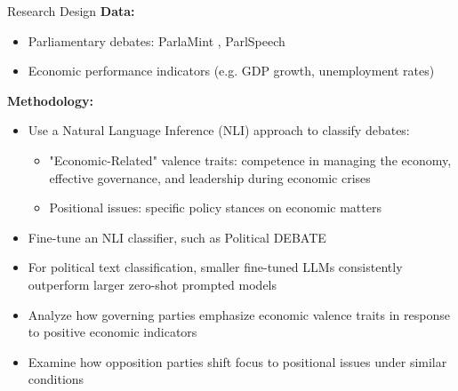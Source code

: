 \documentclass[9pt, aspectratio=169]{beamer}
\newcommand{\customcite}[1]{\textcolor{blue}{\footnotesize\parencite{#1}}}
\begin{document}
\begin{frame}{Research Design}
    \textbf{Data:} \vspace{0.1cm}
    \begin{itemize}
        \item Parliamentary debates: ParlaMint \customcite{erjavec2023parlamint}, ParlSpeech \customcite{rauh2020parlspeech} \vspace{0.1cm}
        \item Economic performance indicators (e.g. GDP growth, unemployment rates)
    \end{itemize}
    \vspace{0.3cm}
    
    \textbf{Methodology:} \vspace{0.1cm}
    \begin{itemize}
        \item Use a Natural Language Inference (NLI) approach to classify debates:\vspace{0.1cm}
        \begin{itemize}
            \item "Economic-Related" valence traits: competence in managing the economy, effective governance, and leadership during economic crises \vspace{0.1cm}
            \item Positional issues: specific policy stances on economic matters \vspace{0.1cm}
        \end{itemize}
        \item Fine-tune an NLI classifier, such as Political DEBATE \customcite{burnham2024political} \vspace{0.1cm}
        \item For political text classification, smaller fine-tuned LLMs consistently outperform larger zero-shot prompted models \customcite{bucher2024finetunedsmallllmsstill} \vspace{0.1cm}
        \item Analyze how governing parties emphasize economic valence traits in response to positive economic indicators \vspace{0.1cm}
        \item Examine how opposition parties shift focus to positional issues under similar conditions
    \end{itemize}
    \vspace{0.3cm}
\end{frame}
\end{document}

